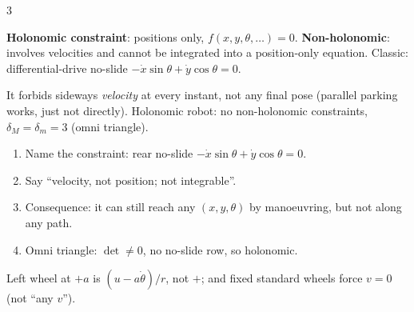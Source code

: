\begin{multicols}{3}
\begin{fbx}[Definitions]
\textbf{Holonomic constraint}: positions only, $f(x,y,\theta,\dots)=0$. \textbf{Non-holonomic}: involves velocities and cannot be integrated into a position-only equation. Classic: differential-drive no-slide $-\dot x\sin\theta+\dot y\cos\theta=0$.
\end{fbx}
It forbids sideways \emph{velocity} at every instant, not any final pose (parallel parking works, just not directly). Holonomic robot: no non-holonomic constraints, $\delta_M=\delta_m=3$ (omni triangle).
\begin{recipe}
\begin{enumerate}
\item Name the constraint: rear no-slide $-\dot x\sin\theta+\dot y\cos\theta=0$.
\item Say ``velocity, not position; not integrable''.
\item Consequence: it can still reach any $(x,y,\theta)$ by manoeuvring, but not along any path.
\item Omni triangle: $\det\ne0$, no no-slide row, so holonomic.
\end{enumerate}
\end{recipe}
\begin{trap}
Left wheel at $+a$ is $(u-a\dot\theta)/r$, not $+$; and fixed standard wheels force $v=0$ (not ``any $v$'').
\end{trap}
\end{multicols}
